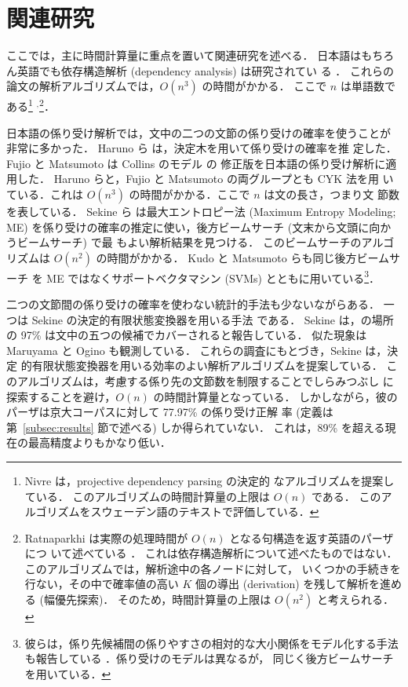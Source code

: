 \documentclass[japanese]{jnlp_1.2c}
\begin{document}
\section{関連研究}
ここでは，主に時間計算量に重点を置いて関連研究を述べる．
日本語はもちろん英語でも依存構造解析 (dependency analysis) は研究されてい
る \cite{Lafferty1992,Collins1996,Eisner1996}．
これらの論文の解析アルゴリズムでは，$O(n^{3})$ の時間がかかる．
ここで $n$ は単語数である\footnote{
Nivre  は，projective dependency parsing の決定的
なアルゴリズムを提案している．
このアルゴリズムの時間計算量の上限は $O(n)$ である．
このアルゴリズムをスウェーデン語のテキストで評価している．}
    $^{,}$\footnote{
Ratnaparkhi は実際の処理時間が $O(n)$ となる句構造を返す英語のパーザにつ
いて述べている \cite{Ratnaparkhi1997}．
これは依存構造解析について述べたものではない．
このアルゴリズムでは，解析途中の各ノードに対して，
いくつかの手続きを行ない，その中で確率値の高い $K$ 個の導出 
(derivation) を残して解析を進める (幅優先探索)．
そのため，時間計算量の上限は $O(n^2)$ と考えられる．
}．


日本語の係り受け解析では，文中の二つの文節の係り受けの確率を使うことが
非常に多かった．
Haruno ら  は，決定木を用いて係り受けの確率を推
定した．
Fujio と Matsumoto  は Collins のモデル\cite{Collins1996} の
修正版を日本語の係り受け解析に適用した．
Haruno らと，Fujio と Matsumoto の両グループとも CYK 法を用
いている．これは $O(n^{3})$ の時間がかかる．ここで $n$ は文の長さ，つまり文
節数を表している．
Sekine ら  は最大エントロピー法 (Maximum
Entropy Modeling; ME) を係り受けの確率の推定に使い，後方ビームサーチ 
(文末から文頭に向かうビームサーチ) で最
もよい解析結果を見つける．
このビームサーチのアルゴリズムは $O(n^{2})$ の時間がかかる．
Kudo と Matsumoto  らも同じ後方ビームサーチ
を ME ではなくサポートベクタマシン (SVMs) とともに用いている\footnote{
彼らは，係り先候補間の係りやすさの相対的な大小関係をモデル化する手法
も報告している \cite{Kudo2005}．係り受けのモデルは異なるが，
同じく後方ビームサーチを用いている．
}．

二つの文節間の係り受けの確率を使わない統計的手法も少ないながらある．
一つは Sekine の決定的有限状態変換器を用いる手法\cite{Sekine2000Japanese} である．
Sekine は，\TermHead{}の場所の 
97\% は文中の五つの候補でカバーされると報告している．
似た現象は Maruyama と Ogino \cite{Maruyama1992} も観測している．
これらの調査にもとづき，Sekine は，決定
的有限状態変換器を用いる効率のよい解析アルゴリズムを提案している．
このアルゴリズムは，考慮する係り先の文節数を制限することでしらみつぶし
に探索することを避け，$O(n)$ の時間計算量となっている．
しかしながら，彼のパーザは京大コーパスに対して 77.97\% の係り受け正解
率 (定義は第~\ref{subsec:results} 節で述べる) しか得られていない．
これは，89\% を超える現在の最高精度よりもかなり低い．
\end{document}
